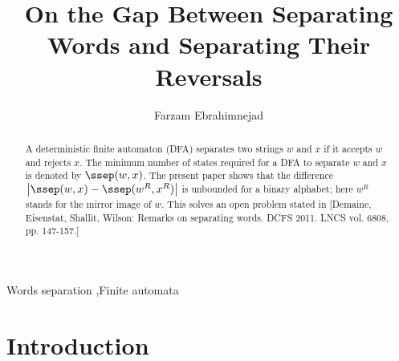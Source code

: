 \documentclass[preprint, 12pt]{elsarticle}
\begin{document}
\begin{frontmatter}
\title{On the Gap Between Separating Words and Separating Their Reversals}

	\author[farzam]{Farzam Ebrahimnejad}

	\address[farzam]{Department of Computer Engineering, Sharif University of Technology, Tehran, Iran}
	\begin{abstract}
	A deterministic finite automaton (DFA) separates two strings $w$ and $x$ 
if it accepts $w$ and rejects $x$.
The minimum number of states required 
for a DFA to separate $w$ and $x$ is denoted by $\ssep(w,x)$.
The present paper shows that the difference $\left|\ssep(w,x)-\ssep(w^R,x^R)\right|$ 
is unbounded for a binary alphabet; 
here $w^R$ stands for the mirror image of $w$. 
This solves an open problem stated in 
[Demaine, Eisenstat, Shallit, Wilson: Remarks on separating words. 
DCFS 2011. LNCS vol. 6808, pp. 147-157.]
	\end{abstract}
	\begin{keyword}
		Words separation \sep Finite automata
	\end{keyword}


\end{frontmatter}


	
\section{Introduction}
	
\end{document}
